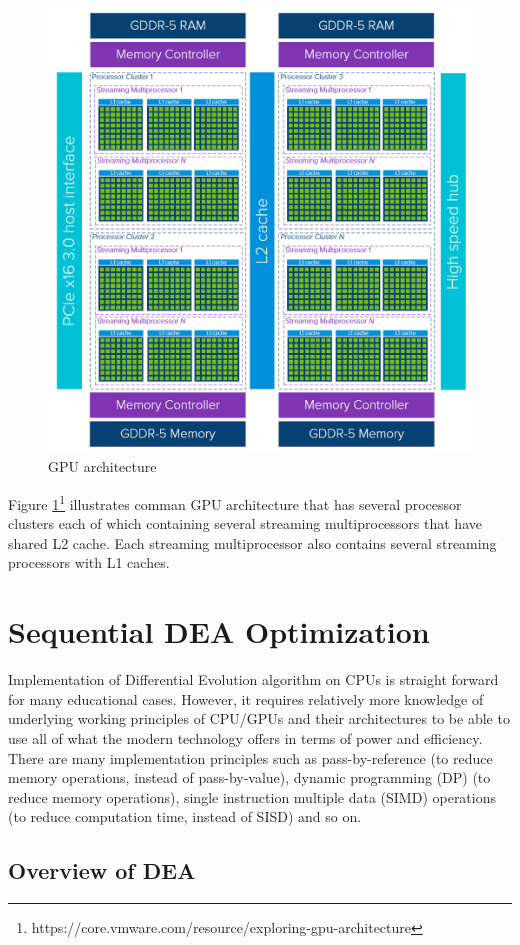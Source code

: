 \documentclass[conference]{IEEEtran}
\begin{document}
\begin{figure}[h]
	\centering
	\includegraphics[width=0.75\linewidth]{img/gpu-architecture.png}
	\caption{GPU architecture}
	\label{fig:gpu_arch}
\end{figure}

Figure \ref{fig:gpu_arch}\footnote{https://core.vmware.com/resource/exploring-gpu-architecture} illustrates comman GPU architecture that has several processor clusters each of which containing several 
streaming multiprocessors that have shared L2 cache. Each streaming multiprocessor also contains several streaming processors with L1 caches.

\section{Sequential DEA Optimization}
Implementation of Differential Evolution algorithm on CPUs is straight forward for many educational cases. However, it requires relatively more knowledge of underlying working principles of CPU/GPUs and 
their architectures to be able to use all of what the modern technology offers in terms of power and efficiency. There are many implementation principles such as pass-by-reference 
(to reduce memory operations, instead of pass-by-value), dynamic programming (DP) (to reduce memory operations), single instruction multiple data (SIMD) operations 
(to reduce computation time, instead of SISD) and so on.

\subsection{Overview of DEA}
\end{document}
